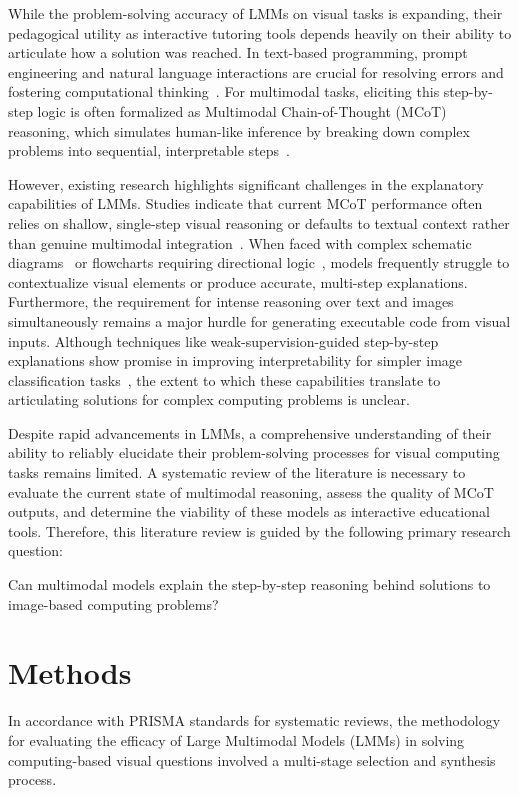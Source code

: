\documentclass[sigconf, nonacm]{acmart}
\begin{document}
While the problem-solving accuracy of LMMs on visual tasks is expanding, their pedagogical utility as 
interactive tutoring tools depends heavily on their ability to articulate how a solution was reached. 
In text-based programming, prompt engineering and natural language interactions are crucial for resolving 
errors and fostering computational thinking~\cite{denny2023conversing}. For multimodal tasks, 
eliciting this step-by-step logic is often formalized as Multimodal Chain-of-Thought (MCoT) reasoning, 
which simulates human-like inference by breaking down complex problems into sequential, interpretable steps~\cite{chen2024m3cot}.

However, existing research highlights significant challenges in the explanatory capabilities of LMMs. 
Studies indicate that current MCoT performance often relies on shallow, single-step visual reasoning or 
defaults to textual context rather than genuine multimodal integration~\cite{chen2024m3cot}. 
When faced with complex schematic diagrams~\cite{zhao2025missqa} or flowcharts requiring directional logic~\cite{singh2024flowvqa}, 
models frequently struggle to contextualize visual elements or produce accurate, multi-step explanations. 
Furthermore, the requirement for intense reasoning over text and images simultaneously remains 
a major hurdle for generating executable code from visual inputs. 
Although techniques like weak-supervision-guided step-by-step explanations show promise in 
improving interpretability for simpler image classification tasks~\cite{jiang2025wise}, 
the extent to which these capabilities translate to articulating solutions for complex computing problems is unclear.

Despite rapid advancements in LMMs, a comprehensive understanding of their ability to 
reliably elucidate their problem-solving processes for visual computing tasks remains limited. 
A systematic review of the literature is necessary to evaluate the current state of multimodal reasoning, 
assess the quality of MCoT outputs, and determine the viability of these models as interactive educational tools. 
Therefore, this literature review is guided by the following primary research question:

Can multimodal models explain the step-by-step reasoning behind solutions to image-based computing problems?

\section{Methods}
In accordance with PRISMA standards for systematic reviews, the methodology for 
evaluating the efficacy of Large Multimodal Models (LMMs) in solving 
computing-based visual questions involved a multi-stage selection and synthesis 
process.
\end{document}
